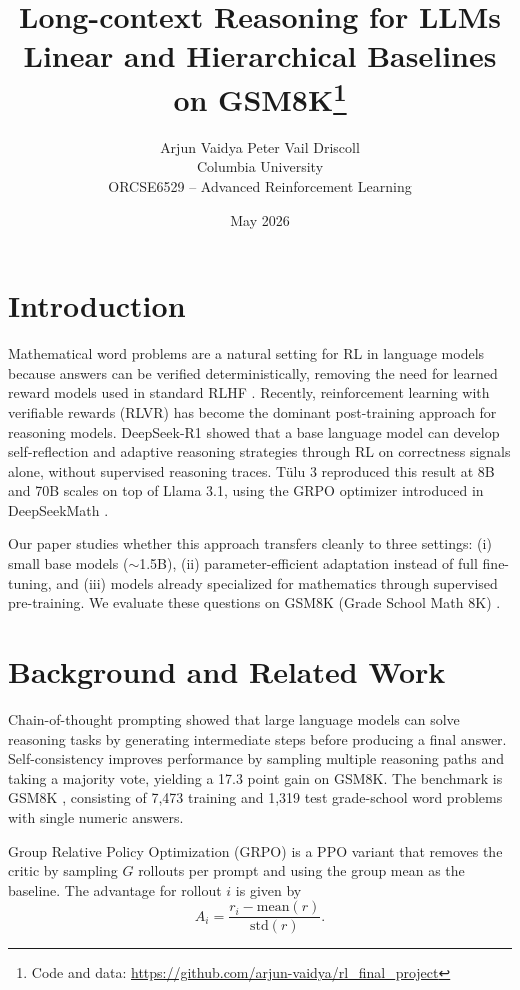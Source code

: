 \documentclass[11pt]{article}
\title{Long-context Reasoning for LLMs\\
       Linear and Hierarchical Baselines on GSM8K\thanks{Code and data: \url{https://github.com/arjun-vaidya/rl_final_project}}}
\author{Arjun Vaidya \quad Peter Vail Driscoll \\
        Columbia University \\
        ORCSE6529 -- Advanced Reinforcement Learning}
\date{May 2026}
\begin{document}
\maketitle

\section{Introduction}
\label{sec:intro}

Mathematical word problems are a natural setting for RL in language models because answers can be verified deterministically, removing the need for learned reward models used in standard RLHF \citep{ouyang2022instructgpt}. Recently, reinforcement learning with verifiable rewards (RLVR) has become the dominant post-training approach for reasoning models. DeepSeek-R1 \citep{deepseekr1} showed that a base language model can develop self-reflection and adaptive reasoning strategies through RL on correctness signals alone, without supervised reasoning traces. T\"ulu 3 \citep{lambert2024tulu3} reproduced this result at 8B and 70B scales on top of Llama 3.1, using the GRPO optimizer introduced in DeepSeekMath \citep{shao2024deepseekmath}.

\medskip

Our paper studies whether this approach transfers cleanly to three settings: (i) small base models ($\sim$1.5B), (ii) parameter-efficient adaptation instead of full fine-tuning, and (iii) models already specialized for mathematics through supervised pre-training. We evaluate these questions on GSM8K (Grade School Math 8K) \citep{cobbe2021}.

\medskip

\section{Background and Related Work}
\label{sec:background}

Chain-of-thought prompting \citep{wei2022cot} showed that large language models can solve reasoning tasks by generating intermediate steps before producing a final answer. Self-consistency \citep{wang2022sc} improves performance by sampling multiple reasoning paths and taking a majority vote, yielding a 17.3 point gain on GSM8K. The benchmark is GSM8K \citep{cobbe2021}, consisting of 7{,}473 training and 1{,}319 test grade-school word problems with single numeric answers.

\medskip
Group Relative Policy Optimization (GRPO) \citep{shao2024deepseekmath} is a PPO variant \citep{schulman2017ppo} that removes the critic by sampling $G$ rollouts per prompt and using the group mean as the baseline. The advantage for rollout $i$ is given by
\[
A_i = \frac{r_i - \mathrm{mean}(r)}{\mathrm{std}(r)}.
\]
\end{document}
